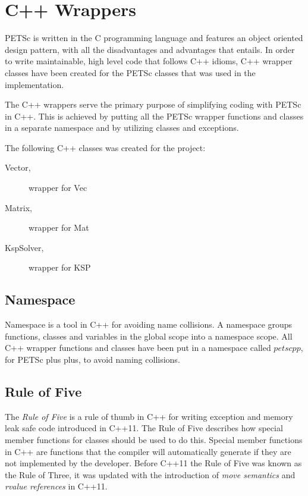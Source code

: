 \section{C++ Wrappers}

PETSc is written in the C programming language and features an object oriented
design pattern, with all the disadvantages and advantages that entails. In order
to write maintainable, high level code that follows C++ idioms, C++ wrapper
classes have been created for the PETSc classes that was used in the
implementation.

The C++ wrappers serve the primary purpose of simplifying coding with PETSc in
C++. This is achieved by putting all the PETSc wrapper functions and classes in
a separate namespace and by utilizing classes and exceptions.

The following C++ classes was created for the project:
\begin{description}
	\item[Vector,] wrapper for Vec
	\item[Matrix,] wrapper for Mat
	\item[KspSolver,] wrapper for KSP
\end{description}

\subsection{Namespace}

Namespace is a tool in C++ for avoiding name collisions. A namespace groups
functions, classes and variables in the global scope into a namespace scope.
All C++ wrapper functions and classes have been put in a namespace called
$petscpp$, for PETSc plus plus, to avoid naming collisions.

\subsection{Rule of Five}

The \emph{Rule of Five} is a rule of thumb in C++ for writing exception and
memory leak safe code introduced in C++11. The Rule of Five describes how 
special member functions for classes should be used to do this. Special member
functions in C++ are functions that the compiler will automatically generate if
they are not implemented by the developer. Before C++11 the Rule of Five was
known as the Rule of Three, it was updated with the introduction of \emph{move
semantics} and \emph{rvalue references} in C++11.

